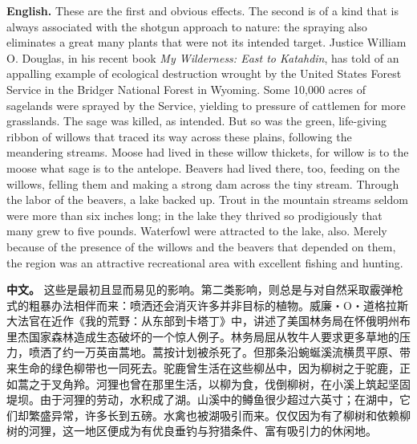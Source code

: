 \noindent\textbf{English.} These are the first and obvious effects. The second is of a kind that is always associated with the shotgun approach to nature: the spraying also eliminates a great many plants that were not its intended target. Justice William O. Douglas, in his recent book \textit{My Wilderness: East to Katahdin}, has told of an appalling example of ecological destruction wrought by the United States Forest Service in the Bridger National Forest in Wyoming. Some 10,000 acres of sagelands were sprayed by the Service, yielding to pressure of cattlemen for more grasslands. The sage was killed, as intended. But so was the green, life-giving ribbon of willows that traced its way across these plains, following the meandering streams. Moose had lived in these willow thickets, for willow is to the moose what sage is to the antelope. Beavers had lived there, too, feeding on the willows, felling them and making a strong dam across the tiny stream. Through the labor of the beavers, a lake backed up. Trout in the mountain streams seldom were more than six inches long; in the lake they thrived so prodigiously that many grew to five pounds. Waterfowl were attracted to the lake, also. Merely because of the presence of the willows and the beavers that depended on them, the region was an attractive recreational area with excellent fishing and hunting.
\par
\noindent\textbf{中文。} 这些是最初且显而易见的影响。第二类影响，则总是与对自然采取霰弹枪式的粗暴办法相伴而来：喷洒还会消灭许多并非目标的植物。威廉・O・道格拉斯大法官在近作《我的荒野：从东部到卡塔丁》中，讲述了美国林务局在怀俄明州布里杰国家森林造成生态破坏的一个惊人例子。林务局屈从牧牛人要求更多草地的压力，喷洒了约一万英亩蒿地。蒿按计划被杀死了。但那条沿蜿蜒溪流横贯平原、带来生命的绿色柳带也一同死去。驼鹿曾生活在这些柳丛中，因为柳树之于驼鹿，正如蒿之于叉角羚。河狸也曾在那里生活，以柳为食，伐倒柳树，在小溪上筑起坚固堤坝。由于河狸的劳动，水积成了湖。山溪中的鳟鱼很少超过六英寸；在湖中，它们却繁盛异常，许多长到五磅。水禽也被湖吸引而来。仅仅因为有了柳树和依赖柳树的河狸，这一地区便成为有优良垂钓与狩猎条件、富有吸引力的休闲地。
\par\medskip


